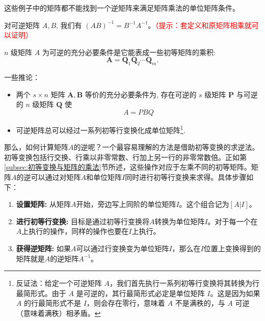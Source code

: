 这些例子中的矩阵都不能找到一个逆矩阵来满足矩阵乘法的单位矩阵条件。


\begin{proposition}[矩阵的逆的运算性质]
    对可逆矩阵 $A, B$, 我们有 $(A B)^{-1}=B^{-1} A^{-1}$。\textcolor{red}{（提示：套定义和原矩阵相乘就可以证明）}
\end{proposition}

\begin{theorem}[矩阵可逆的充分必要条件]
$n$ 级矩阵 $A$ 为可逆的充分必要条件是它能表成一些初等矩阵的乘积:
$$
\boldsymbol{A}=\boldsymbol{Q}_1 \boldsymbol{Q}_2 \cdots \boldsymbol{Q}_m .
$$
\end{theorem}

一些推论：
\begin{itemize}
    \item 两个 $s \times n$ 矩阵 $\boldsymbol{A}, \boldsymbol{B}$ 等价的充分必要条件为, 存在可逆的 $s$ 级矩阵 $\boldsymbol{P}$ 与可逆的 $n$ 级矩阵 $\boldsymbol{Q}$ 使
$$
A=P B Q
$$
    \item 可逆矩阵总可以经过一系列初等行变换化成单位矩阵\footnote{反证法：给定一个可逆矩阵 \(A\)，我们首先执行一系列初等行变换将其转换为行最简形式。由于 \(A\) 是可逆的，其行最简形式必定是单位矩阵 \(I\)。这是因为如果 \(A\) 的行最简形式不是 \(I\)，则会存在零行，意味着 \(A\) 不是满秩的，与 \(A\) 可逆（意味着满秩）相矛盾。}.
\end{itemize}

\vspace{0.5cm}

那么，如何计算矩阵\(A\)的逆呢？一个最容易理解的方法是借助初等变换的求逆法。初等变换包括行交换、行乘以非零常数、行加上另一行的非零常数倍。正如第\ref{subsec:初等变换与矩阵的乘法}节所述，这些操作对应于左乘不同的初等矩阵。矩阵\(A\)的逆可以通过对矩阵\(A\)和单位矩阵\(I\)同时进行初等行变换来求得。具体步骤如下：

\begin{enumerate}
    \item \textbf{设置矩阵:} 从矩阵\(A\)开始，旁边写上同阶的单位矩阵\(I\)。这个组合记为\([A|I]\)。
    \item \textbf{进行初等行变换:} 目标是通过初等行变换将\(A\)转换为单位矩阵\(I\)。对于每一个在\(A\)上执行的操作，同样的操作也要在\(I\)上执行。
    \item \textbf{获得逆矩阵:} 如果\(A\)可以通过行变换变为单位矩阵\(I\)，那么在\(I\)位置上变换得到的矩阵就是\(A\)的逆矩阵\(A^{-1}\)。
\end{enumerate}


